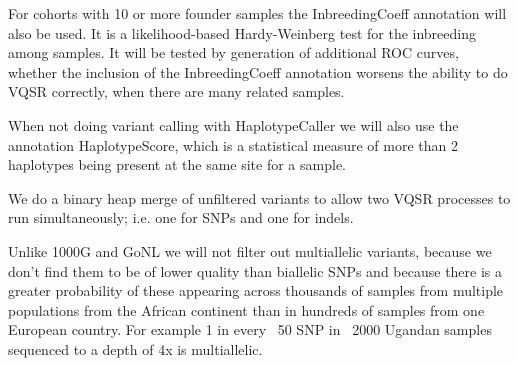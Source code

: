 For cohorts with 10 or more founder samples the InbreedingCoeff annotation will also be used. It is a likelihood-based Hardy-Weinberg test for the inbreeding among samples. It will be tested by generation of additional ROC curves, whether the inclusion of the InbreedingCoeff annotation worsens the ability to do VQSR correctly, when there are many related samples.

When not doing variant calling with HaplotypeCaller we will also use the annotation HaplotypeScore, which is a statistical measure of more than 2 haplotypes being present at the same site for a sample.

We do a binary heap merge of unfiltered variants to allow two VQSR processes to run simultaneously; i.e. one for SNPs and one for indels.

Unlike 1000G and GoNL we will not filter out multiallelic variants, because we don't find them to be of lower quality than biallelic SNPs and because there is a greater probability of these appearing across thousands of samples from multiple populations from the African continent than in hundreds of samples from one European country. For example 1 in every ~50 SNP in ~2000 Ugandan samples sequenced to a depth of 4x is multiallelic.
